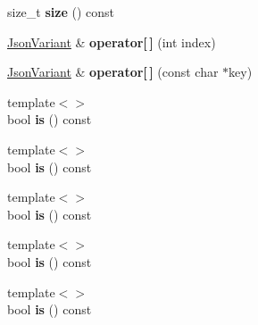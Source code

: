 \begin{DoxyCompactItemize}
\item 
\hypertarget{class_arduino_json_1_1_json_variant_a5f4a989cba96104a21da09fab5e80dc4}{}size\+\_\+t {\bfseries size} () const \label{class_arduino_json_1_1_json_variant_a5f4a989cba96104a21da09fab5e80dc4}

\item 
\hypertarget{class_arduino_json_1_1_json_variant_aaceb78c775794ac2947411ac654945c8}{}\hyperlink{class_arduino_json_1_1_json_variant}{Json\+Variant} \& {\bfseries operator\mbox{[}$\,$\mbox{]}} (int index)\label{class_arduino_json_1_1_json_variant_aaceb78c775794ac2947411ac654945c8}

\item 
\hypertarget{class_arduino_json_1_1_json_variant_a10805433be041a3065e3e2f11d07d82b}{}\hyperlink{class_arduino_json_1_1_json_variant}{Json\+Variant} \& {\bfseries operator\mbox{[}$\,$\mbox{]}} (const char $\ast$key)\label{class_arduino_json_1_1_json_variant_a10805433be041a3065e3e2f11d07d82b}

\item 
\hypertarget{class_arduino_json_1_1_json_variant_a4c7167a72efd02a254688616634ebf55}{}{\footnotesize template$<$$>$ }\\bool {\bfseries is} () const \label{class_arduino_json_1_1_json_variant_a4c7167a72efd02a254688616634ebf55}

\item 
\hypertarget{class_arduino_json_1_1_json_variant_a4c7167a72efd02a254688616634ebf55}{}{\footnotesize template$<$$>$ }\\bool {\bfseries is} () const \label{class_arduino_json_1_1_json_variant_a4c7167a72efd02a254688616634ebf55}

\item 
\hypertarget{class_arduino_json_1_1_json_variant_a4c7167a72efd02a254688616634ebf55}{}{\footnotesize template$<$$>$ }\\bool {\bfseries is} () const \label{class_arduino_json_1_1_json_variant_a4c7167a72efd02a254688616634ebf55}

\item 
\hypertarget{class_arduino_json_1_1_json_variant_a4c7167a72efd02a254688616634ebf55}{}{\footnotesize template$<$$>$ }\\bool {\bfseries is} () const \label{class_arduino_json_1_1_json_variant_a4c7167a72efd02a254688616634ebf55}

\item 
\hypertarget{class_arduino_json_1_1_json_variant_a4c7167a72efd02a254688616634ebf55}{}{\footnotesize template$<$$>$ }\\bool {\bfseries is} () const \label{class_arduino_json_1_1_json_variant_a4c7167a72efd02a254688616634ebf55}


\end{DoxyCompactItemize}
